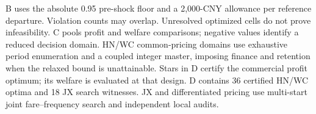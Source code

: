 \begin{table}[htbp]
\begin{minipage}{.95\textwidth}
\begin{tabular*}{\linewidth}{@{\extracolsep{\fill}}llrrrrrr@{}}
\bottomrule\end{tabular*}\par\medskip
\par\noindent\fontsize{8}{9.5}\selectfont B uses the absolute 0.95 pre-shock floor and a 2,000-CNY allowance per reference departure. Violation counts may overlap. Unresolved optimized cells do not prove infeasibility. C pools profit and welfare comparisons; negative values identify a reduced decision domain. HN/WC common-pricing domains use exhaustive period enumeration and a coupled integer master, imposing finance and retention when the relaxed bound is unattainable. Stars in D certify the commercial profit optimum; its welfare is evaluated at that design. D contains 36 certified HN/WC optima and 18 JX search witnesses. JX and differentiated pricing use multi-start joint fare--frequency search and independent local audits.
\end{minipage}\end{table}
